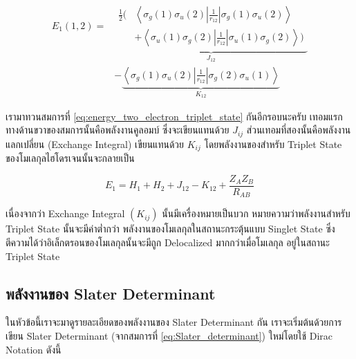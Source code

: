 \begin{equation}
    \label{eq:energy_two_electron_triplet_state}
    \begin{aligned}
        E_1(1,2)
        = &
        \underbrace{
            \begin{aligned}
                \frac{1}{2}
                \biggl(
                 & \left\langle\sigma_g(1) \sigma_u(2)
                \left|\frac{1}{r_{12}}\right|
                \sigma_g(1) \sigma_u(2)\right\rangle     \\
                 & + \left\langle\sigma_u(1) \sigma_g(2)
                \left|\frac{1}{r_{12}}\right|
                \sigma_u(1) \sigma_g(2)\right\rangle
                \biggl)
            \end{aligned}
        }_{J_{12}}        \\
          & -\underbrace{
            \left\langle\sigma_g(1) \sigma_u(2)
            \left|\frac{1}{r_{12}}\right|
            \sigma_g(2) \sigma_u(1)\right\rangle}
        _{K_{12}}
    \end{aligned}
\end{equation}

เรามาทวนสมการที่ \ref{eq:energy_two_electron_triplet_state} กันอีกรอบนะครับ เทอมแรกทางด้านขวาของสมการนั้นคือพลังงานคูลอมบ์%
ซึ่งจะเขียนแทนด้วย $J_{i j}$ ส่วนเทอมที่สองนั้นคือพลังงานแลกเปลี่ยน (Exchange Integral) เขียนแทนด้วย $K_{i j}$ โดยพลังงานของสำหรับ
Triplet State ของโมเลกุลไฮโดรเจนนั้นจะกลายเป็น

\begin{equation}
    E_1
    =
    H_1 + H_2 + J_{12} - K_{12} + \frac{Z_A Z_B}{R_{A B}}
\end{equation}

เนื่องจากว่า Exchange Integral $(K_{i j})$ นั้นมีเครื่องหมายเป็นบวก หมายความว่าพลังงานสำหรับ Triplet State นั้นจะมีค่าต่ำกว่า%
พลังงานของโมเลกุลในสถานะกระตุ้นแบบ Singlet State ซึ่งตีความได้ว่าอิเล็กตรอนของโมเลกุลนั้นจะมีถูก Delocalized มากกว่าเมื่อโมเลกุล%
อยู่ในสถานะ Triplet State

\subsection{พลังงานของ Slater Determinant}

ในหัวข้อนี้เราจะมาดูรายละเอียดของพลังงานของ Slater Determinant กัน เราจะเริ่มต้นด้วยการเขียน Slater Determinant (จากสมการที่
\ref{eq:Slater_determinant}) ใหม่โดยใช้ Dirac Notation ดังนี้

